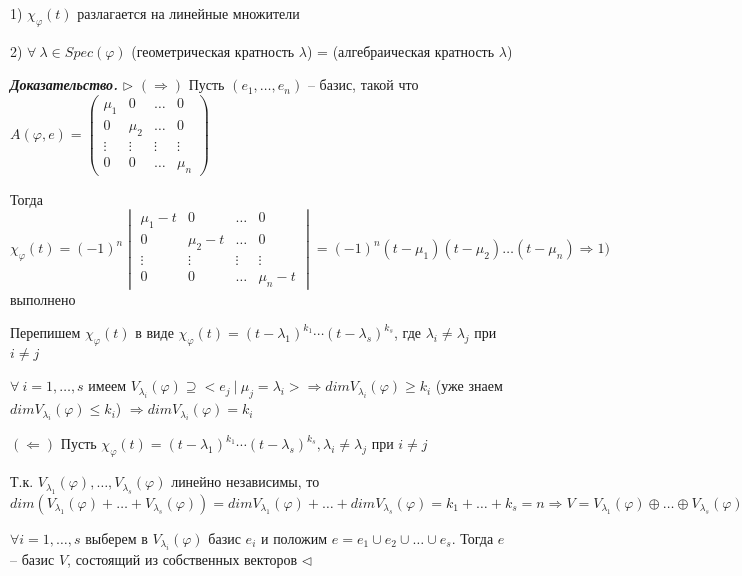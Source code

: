 1) $\chi_{\varphi} (t)$ разлагается на линейные множители

2) $\forall \ \lambda \in Spec(\varphi)$ (геометрическая кратность $\lambda$) = (алгебраическая кратность $\lambda$)

\vspace{\baselineskip}
\textbf{\textit{Доказательство.}} $\rhd$ $(\Rightarrow)$ Пусть $(e_1, \dots, e_n)$ -- базис, такой что $A(\varphi, e) = \begin{pmatrix} \mu_1 & 0 & \dots & 0 \\ 0 & \mu_2 & \dots & 0 \\ \vdots & \vdots & \vdots & \vdots \\ 0 & 0 & \dots & \mu_n \end{pmatrix}$

Тогда $\chi_{\varphi} (t) = (-1)^n \begin{vmatrix} \mu_1 - t & 0 & \dots & 0 \\ 0 & \mu_2 - t & \dots & 0 \\ \vdots & \vdots & \vdots & \vdots \\ 0 & 0 & \dots & \mu_n - t \end{vmatrix} = (-1)^n (t - \mu_1) (t - \mu_2) \dots (t - \mu_n) \Rightarrow 1)$ выполнено

Перепишем $\chi_\varphi (t)$ в виде $\chi_\varphi (t) = (t - \lambda_1)^{k_1} \cdots (t - \lambda_s)^{k_s}$, где $\lambda_i \neq \lambda_j$ при $i \neq j$

$\forall \ i = 1, \dots, s$ имеем $V_{\lambda_i} (\varphi) \supseteq <e_j \ | \ \mu_j = \lambda_i > \Rightarrow dim V_{\lambda_i} (\varphi) \geq k_i$ (уже знаем $dim V_{\lambda_i} (\varphi) \leq k_i$) $\Rightarrow dim V_{\lambda_i} (\varphi) = k_i$

\vspace{\baselineskip}
$(\Leftarrow)$ Пусть $\chi_{\varphi} (t) = (t - \lambda_1)^{k_1} \cdots  (t - \lambda_s)^{k_s}, \lambda_i \neq \lambda_j$ при $i \neq j$

Т.к. $V_{\lambda_1} (\varphi), \dots, V_{\lambda_s} (\varphi)$ линейно независимы, то $dim (V_{\lambda_1} (\varphi) + \dots + V_{\lambda_s} (\varphi)) = dim V_{\lambda_1} (\varphi) + \dots + dim V_{\lambda_s} (\varphi) = k_1 + \dots + k_s = n \Rightarrow V = V_{\lambda_1} (\varphi) \oplus \dots \oplus V_{\lambda_s} (\varphi)$

$\forall i = 1, \dots, s$ выберем в $V_{\lambda_i} (\varphi)$ базис $e_i$ и положим $e = e_1 \cup e_2 \cup \dots \cup e_s$. Тогда $e$ -- базис $V$, состоящий из собственных векторов $\lhd$

